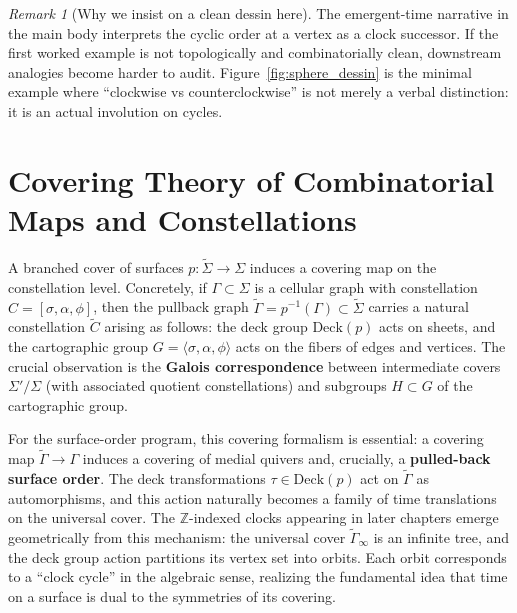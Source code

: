 \documentclass[11pt,oneside]{amsbook}
\numberwithin{equation}{section}
\theoremstyle{plain}
\theoremstyle{definition}
\theoremstyle{remark}
\newtheorem{remark}[theorem]{Remark}
\begin{document}
\begin{remark}[Why we insist on a clean dessin here]
The emergent-time narrative in the  main body interprets the cyclic order at a vertex as a clock successor.  If the first worked example is not topologically and combinatorially clean, downstream analogies become harder to audit.  Figure~\ref{fig:sphere_dessin} is the minimal example where ``clockwise vs counterclockwise'' is not merely a verbal distinction: it is an actual involution on cycles.
\end{remark}


	
	
	\section{Covering Theory of Combinatorial Maps and Constellations}

	A branched cover of surfaces $p: \tilde{\Sigma} \to \Sigma$ induces a covering map on the constellation level.
	Concretely, if $\Gamma \subset \Sigma$ is a cellular graph with constellation $C = [\sigma, \alpha, \phi]$, then the pullback graph $\tilde{\Gamma} = p^{-1}(\Gamma) \subset \tilde{\Sigma}$ carries a natural constellation $\tilde{C}$ arising as follows: the deck group $\text{Deck}(p)$ acts on sheets, and the cartographic group $G = \langle \sigma, \alpha, \phi \rangle$ acts on the fibers of edges and vertices. The crucial observation is the \textbf{Galois correspondence} between intermediate covers $\Sigma' / \Sigma$ (with associated quotient constellations) and subgroups $H \subset G$ of the cartographic group.

	For the surface-order program, this covering formalism is essential: a covering map $\tilde{\Gamma} \to \Gamma$ induces a covering of medial quivers and, crucially, a \textbf{pulled-back surface order}. The deck transformations $\tau \in \text{Deck}(p)$ act on $\tilde{\Gamma}$ as automorphisms, and this action naturally becomes a family of time translations on the universal cover. The $\mathbb{Z}$-indexed clocks appearing in later chapters emerge geometrically from this mechanism: the universal cover $\widetilde{\Gamma}_\infty$ is an infinite tree, and the deck group action partitions its vertex set into orbits. Each orbit corresponds to a ``clock cycle'' in the algebraic sense, realizing the fundamental idea that time on a surface is dual to the symmetries of its covering.
\end{document}
